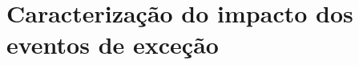 \documentclass[
	12pt,				%
	oneside,			%
	a4paper,			%
	english,			%
	brazil				%
	]{abntex2ppgsi}
\begin{document}
{{{%

\chapter{Caracterização do impacto dos eventos de exceção}
\label{dataCorr}

}}}
\end{document}
